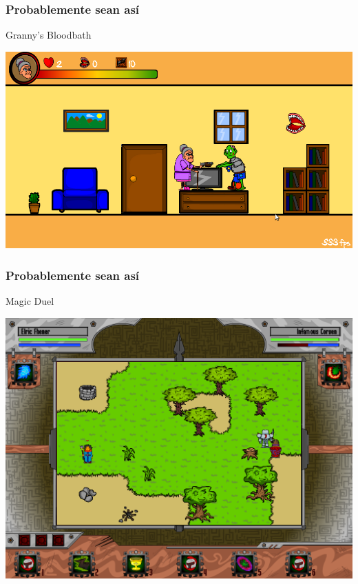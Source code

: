 \begin{frame}
	\frametitle{Probablemente sean así}

	\begin{center}
	Granny's Bloodbath
	
	    \includegraphics[scale=0.3]{img/grannysbloodbath.png}
	\end{center}
\end{frame}

\begin{frame}
	\frametitle{Probablemente sean así}

	\begin{center}
	Magic Duel
	
	    \includegraphics[scale=0.22]{img/magicduel.png}
	\end{center}
\end{frame}

